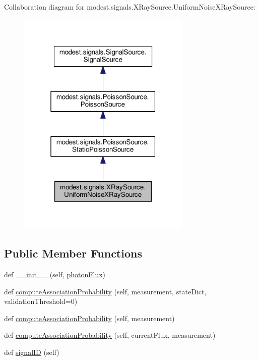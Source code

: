 Collaboration diagram for modest.\+signals.\+X\+Ray\+Source.\+Uniform\+Noise\+X\+Ray\+Source\+:\nopagebreak
\begin{figure}[H]
\begin{center}
\leavevmode
\includegraphics[width=235pt]{classmodest_1_1signals_1_1XRaySource_1_1UniformNoiseXRaySource__coll__graph}
\end{center}
\end{figure}
\subsection*{Public Member Functions}
\begin{DoxyCompactItemize}
\item 
def \hyperlink{classmodest_1_1signals_1_1XRaySource_1_1UniformNoiseXRaySource_a44e0c8fcf7f3dc615addab261cc973d3}{\+\_\+\+\_\+init\+\_\+\+\_\+} (self, \hyperlink{classmodest_1_1signals_1_1XRaySource_1_1UniformNoiseXRaySource_a30ee9fa8b5c01796c79d6accb1932d77}{photon\+Flux})
\item 
def \hyperlink{classmodest_1_1signals_1_1XRaySource_1_1UniformNoiseXRaySource_a817487d1a0126e1e101df0a1493d5eff}{compute\+Association\+Probability} (self, measurement, state\+Dict, validation\+Threshold=0)
\item 
def \hyperlink{classmodest_1_1signals_1_1PoissonSource_1_1StaticPoissonSource_aa22c2473489750cde71c7bd3792a774d}{compute\+Association\+Probability} (self, measurement)
\item 
def \hyperlink{classmodest_1_1signals_1_1PoissonSource_1_1PoissonSource_a86d80fd2ac349efd7df5184800afe7da}{compute\+Association\+Probability} (self, current\+Flux, measurement)
\item 
def \hyperlink{classmodest_1_1signals_1_1SignalSource_1_1SignalSource_af652db2ed97925595d650fd909d6a2d4}{signal\+ID} (self)
\end{DoxyCompactItemize}
